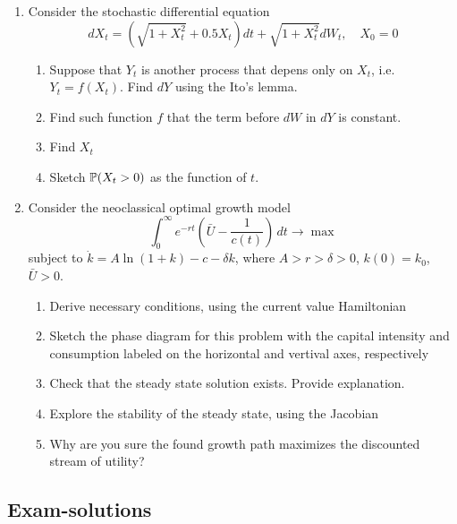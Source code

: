 \documentclass[12pt, a4paper]{article}
\begin{document}
\begin{enumerate}[resume]
\item Consider the stochastic differential equation
\begin{equation}
dX_t=(\sqrt{1+X_t^2}+0.5X_t)dt+\sqrt{1+X_t^2}dW_t,\quad X_0=0 \nonumber
\end{equation}
\begin{enumerate}
\item Suppose that $Y_t$ is another process that depens only on $X_t$, i.e. $Y_t=f(X_t)$. Find $dY$ using the Ito's lemma.
\item Find such function $f$ that the term before $dW$ in $dY$ is constant.
\item Find $X_t$
\item Sketch $\P(X_t>0)$ as the function of $t$.
\end{enumerate}

\item Consider the neoclassical optimal growth model
\begin{equation}
\int_0^{\infty}e^{-rt}\left( \bar{U}-\frac{1}{c(t)}\right)\,dt \to \max \nonumber
\end{equation}
subject to $\dot{k}=A\ln(1+k)-c-\delta k$, where $A>r>\delta>0$, $k(0)=k_0$, $\bar{U}>0$.
\begin{enumerate}
\item Derive necessary conditions, using the current value Hamiltonian
\item Sketch the phase diagram for this problem with the capital intensity and consumption labeled on the horizontal and vertival axes, respectively
\item Check that the steady state solution exists. Provide explanation.
\item Explore the stability of the steady state, using the Jacobian
\item Why are you sure the found growth path maximizes the discounted stream of utility?
\end{enumerate}
\end{enumerate}

\subsection{Exam-solutions}
\end{document}
